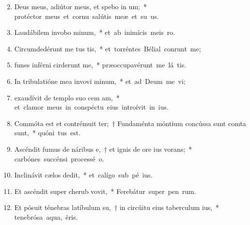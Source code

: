 \begin{flushleft}
\begin{enumerate}[leftmargin=*]
\setcounter{enumi}{1}

\item Deus meus, adiútor meus, et spebo in um;~* \mbox{protéctor meus et cornu salútis meæ et su us.}

\item Laudábilem invobo minum,~* \mbox{et ab inimícis meis  ro.}

\item Circumdedérunt me tus tis,~* \mbox{et torréntes Bélial conrunt me;}

\item funes inférni cirderunt me,~* \mbox{præoccupavérunt me lá tis.}

\item In tribulatióne mea invovi minum,~* \mbox{et ad Deum me vi;}

\item exaudívit de templo suo cem am,~* \mbox{et clamor meus in conspéctu eius introívit in  ius.}

\item Commóta est et contrémuit ter;~† Fundaménta móntium concússa sunt  comta sunt,~* \mbox{quóni tus est.}

\item Ascéndit fumus de náribus e,~† et ignis de ore ius vorans;~* \mbox{carbónes succénsi processé  o.}

\item Inclinávit cælos  dedit,~* \mbox{et calígo sub pé ius.}

\item Et ascéndit super cherub  vovit,~* \mbox{Ferebátur super pen rum.}

\item Et pósuit ténebras latíbulum su,~† in circúitu eius taberculum ius,~* \mbox{tenebrósa aqua,  ëris.}


\end{enumerate}
\end{flushleft}
